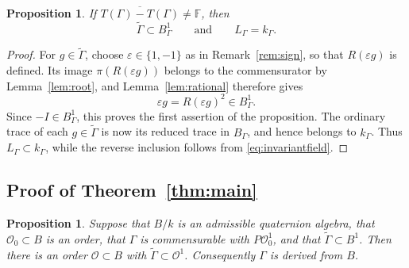 \documentclass[reqno]{amsart}
\newtheorem{proposition}[theorem]{Proposition}
\theoremstyle{remark}
\newcommand{\F}{\mathbb F}
\newcommand{\G}{\widetilde\Gamma}
\newcommand{\OO}{\mathcal O}
\begin{document}
\begin{proposition}\label{prop:tracefield}
If $\overline{T(\Gamma)-T(\Gamma)}\ne\F$, then
$$
\G\subset B_\Gamma^1
\qquad\text{and}\qquad L_\Gamma=k_\Gamma.
$$
\end{proposition}

\begin{proof}
For $g\in\G$, choose $\varepsilon\in\{1,-1\}$ as in Remark~\ref{rem:sign}, so that $R(\varepsilon g)$ is defined. Its image $\pi(R(\varepsilon g))$ belongs to the commensurator by Lemma~\ref{lem:root}, and Lemma~\ref{lem:rational} therefore gives
$$
\varepsilon g=R(\varepsilon g)^2\in B_\Gamma^1.
$$
Since $-I\in B_\Gamma^1$, this proves the first assertion of the proposition. The ordinary trace of each $g\in\G$ is now its reduced trace in $B_\Gamma$, and hence belongs to $k_\Gamma$. Thus $L_\Gamma\subset k_\Gamma$, while the reverse inclusion follows from \eqref{eq:invariantfield}.
\end{proof}

\subsection{Proof of Theorem~\ref{thm:main}}

\begin{proposition}\label{prop:order}
Suppose that $B/k$ is an admissible quaternion algebra, that $\OO_0\subset B$ is an order, that $\Gamma$ is commensurable with $P\OO_0^1$, and that $\G\subset B^1$. Then there is an order $\OO\subset B$ with $\G\subset\OO^1$. Consequently $\Gamma$ is derived from $B$.
\end{proposition}
\end{document}

